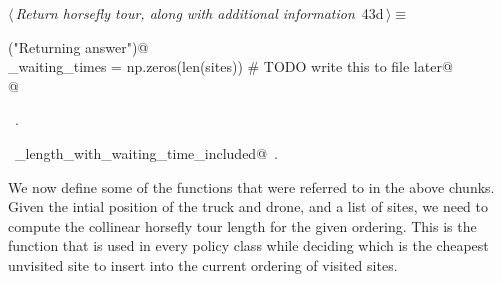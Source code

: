 \documentclass[11.5pt]{report}
\begin{document}
\begin{flushleft} \small\label{scrap63}\raggedright\small
{} $\langle\,${\itshape Return horsefly tour, along with additional information}\nobreak\ {\footnotesize {43d}}$\,\rangle\equiv$
\vspace{-1ex}
\begin{list}{}{} \item
\mbox{}\verb@debug("Returning answer")@\\
\mbox{}\verb@horse_waiting_times = np.zeros(len(sites)) # TODO write this to file later@\\
\mbox{}@\\
\mbox{}\verb@@{\NWsep}
\end{list}
\vspace{-1.5ex}
\footnotesize
\begin{list}{}{\setlength{\itemsep}{-\parsep}\setlength{\itemindent}{-\leftmargin}}
\item \NWtxtMacroRefIn\ .
\item \NWtxtIdentsUsed\nobreak\  \verb@tour_length_with_waiting_time_included@\nobreak\ .
\item{}
\end{list}
\vspace{4ex}
\end{flushleft}

\vspace{-0.8cm}\newchunk We now define some of the functions that were referred to in the above chunks. 
Given the intial position of the truck and drone, and a list of sites, we need to compute 
the collinear horsefly tour length for the given ordering. This is the function that is 
used in every policy class while deciding which is the cheapest unvisited site to insert 
into the current ordering of visited sites. 
\end{document}
